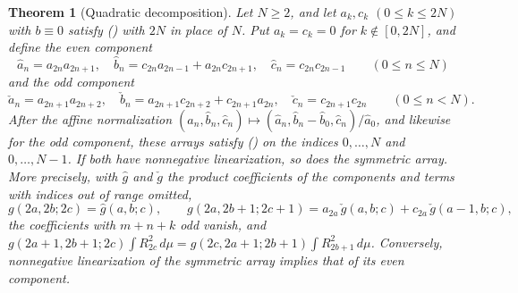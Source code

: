 \documentclass[twoside,10pt]{article}
\numberwithin{equation}{section}
\theoremstyle{slbody}
\newtheorem{theorem}{Theorem}[section]
\theoremstyle{definition}
\theoremstyle{remark}
\renewcommand{\eqref}[1]{\textup{{\normalfont(\oldstylenums{\ref{#1}}}\normalfont)}}
\begin{document}
\begin{theorem}[Quadratic decomposition]\label{thm:decomp}
Let $N\geq2$, and let $a_k,c_k$ $(0\leq k\leq2N)$ with $b\equiv0$ satisfy \eqref{eq:basic} with $2N$ in place of $N$. Put $a_k=c_k=0$ for $k\notin[0,2N]$, and define the even component
\[
\hat a_n=a_{2n}a_{2n+1},\quad \hat b_n=c_{2n}a_{2n-1}+a_{2n}c_{2n+1},\quad \hat c_n=c_{2n}c_{2n-1}\qquad(0\leq n\leq N)
\]
and the odd component
\[
\check a_n=a_{2n+1}a_{2n+2},\quad \check b_n=a_{2n+1}c_{2n+2}+c_{2n+1}a_{2n},\quad \check c_n=c_{2n+1}c_{2n}\qquad(0\leq n<N).
\]
After the affine normalization $(\hat a_n,\hat b_n,\hat c_n)\mapsto(\hat a_n,\hat b_n-\hat b_0,\hat c_n)/\hat a_0$, and likewise for the odd component, these arrays satisfy \eqref{eq:basic} on the indices $0,\ldots,N$ and $0,\ldots,N-1$. If both have nonnegative linearization, so does the symmetric array. More precisely, with $\hat g$ and $\check g$ the product coefficients of the components and terms with indices out of range omitted,
\[
g(2a,2b;2c)=\hat g(a,b;c),\qquad
g(2a,2b+1;2c+1)=a_{2a}\,\check g(a,b;c)+c_{2a}\,\check g(a-1,b;c),
\]
the coefficients with $m+n+k$ odd vanish, and $g(2a+1,2b+1;2c)\int R_{2c}^2\,d\mu=g(2c,2a+1;2b+1)\int R_{2b+1}^2\,d\mu$. Conversely, nonnegative linearization of the symmetric array implies that of its even component.
\end{theorem}
\end{document}
